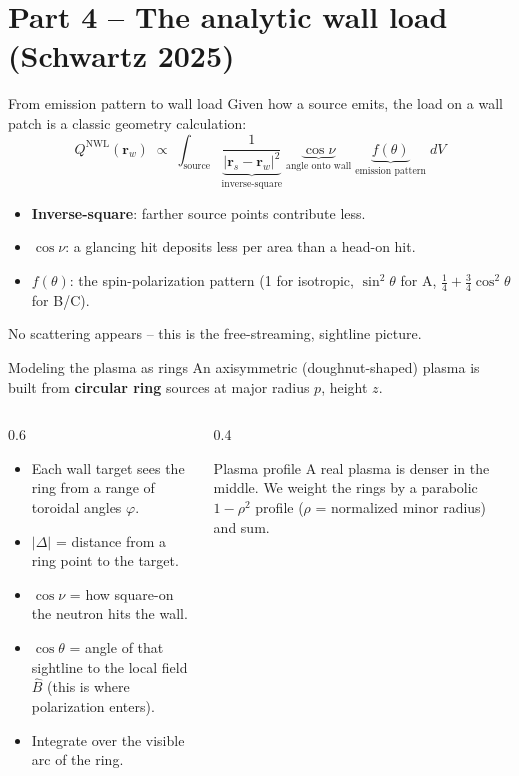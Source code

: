\documentclass[aspectratio=169]{beamer}
\newcommand{\Bhat}{\hat{B}}
\newcommand{\keyword}[1]{\textcolor{blue!60!black}{\textbf{#1}}}
\begin{document}
\section{Part 4 -- The analytic wall load (Schwartz 2025)}
\begin{frame}{From emission pattern to wall load}
  Given how a source emits, the load on a wall patch is a classic geometry calculation:
  \[
    Q^{\text{NWL}}(\mathbf r_w)\;\propto\;\int_{\text{source}} \!\!
      \underbrace{\frac{1}{|\mathbf r_s-\mathbf r_w|^2}}_{\text{inverse-square}}\;
      \underbrace{\cos\nu}_{\text{angle onto wall}}\;
      \underbrace{f(\theta)}_{\text{emission pattern}}\; dV
  \]
  \begin{itemize}
    \item \keyword{Inverse-square}: farther source points contribute less.
    \item \keyword{$\cos\nu$}: a glancing hit deposits less per area than a head-on hit.
    \item \keyword{$f(\theta)$}: the spin-polarization pattern (1 for isotropic, $\sin^2\theta$ for A, $\tfrac14+\tfrac34\cos^2\theta$ for B/C).
  \end{itemize}
  \vfill
  \alert{No scattering appears} -- this is the free-streaming, sightline picture.
\end{frame}

\begin{frame}{Modeling the plasma as rings}
  An axisymmetric (doughnut-shaped) plasma is built from \keyword{circular ring} sources at major radius $p$, height $z$.
  \begin{columns}[T]
    \begin{column}{0.6\linewidth}
      \begin{itemize}\small
        \item Each wall target sees the ring from a range of toroidal angles $\varphi$.
        \item $|\Delta|$ = distance from a ring point to the target.
        \item $\cos\nu$ = how square-on the neutron hits the wall.
        \item $\cos\theta$ = angle of that sightline to the local field $\Bhat$ (this is where polarization enters).
        \item Integrate over the \alert{visible arc} of the ring.
      \end{itemize}
    \end{column}
    \begin{column}{0.4\linewidth}
      \begin{block}{Plasma profile}
        \footnotesize A real plasma is denser in the middle. We weight the rings by a \alert{parabolic} $1-\rho^2$ profile ($\rho$ = normalized minor radius) and sum.
      \end{block}
    \end{column}
  \end{columns}
\end{frame}
\end{document}
